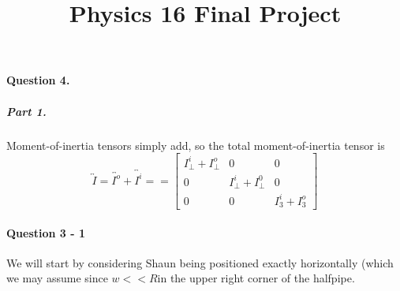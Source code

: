\title{Physics 16 Final Project}


\paragraph{Question 4.}

\subparagraph{Part 1.}  Moment-of-inertia tensors simply add, so the
total moment-of-inertia tensor is $$\overleftrightarrow{I}
= \overleftrightarrow{I^o} + \overleftrightarrow{I^i} =
= \begin{bmatrix}
I_\bot^i + I_\bot^o & 0 & 0 \\
0 & I_\bot^i + I_\bot^0 & 0 \\
0 & 0 & I_3^i + I_3^o
\end{bmatrix}$$

\paragraph{Question 3 - 1}
We will start by considering Shaun being positioned exactly horizontally (which we may assume since $w << R$in the upper right corner of the halfpipe.



